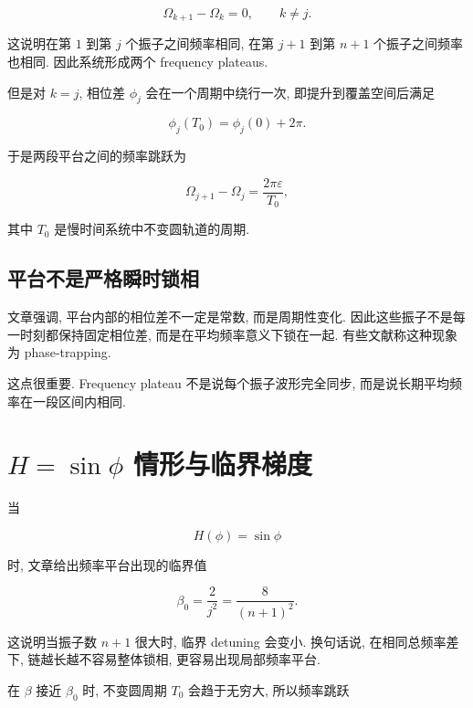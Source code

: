 \documentclass[oneside]{ctexart}
\newcommand{\eps}{\varepsilon}
\begin{document}
\begin{equation}
    \Omega_{k+1}-\Omega_k=0,
    \qquad k\neq j.
\end{equation}

这说明在第 $1$ 到第 $j$ 个振子之间频率相同, 在第 $j+1$ 到第 $n+1$ 个振子之间频率也相同. 因此系统形成两个 frequency plateaus.

但是对 $k=j$, 相位差 $\phi_j$ 会在一个周期中绕行一次, 即提升到覆盖空间后满足

\begin{equation}
    \phi_j(T_0)=\phi_j(0)+2\pi.
\end{equation}

于是两段平台之间的频率跳跃为

\begin{equation}
    \Omega_{j+1}-\Omega_j=\dfrac{2\pi\eps}{T_0},
\end{equation}

其中 $T_0$ 是慢时间系统中不变圆轨道的周期.

\subsection{平台不是严格瞬时锁相}

文章强调, 平台内部的相位差不一定是常数, 而是周期性变化. 因此这些振子不是每一时刻都保持固定相位差, 而是在平均频率意义下锁在一起. 有些文献称这种现象为 phase-trapping.

这点很重要. Frequency plateau 不是说每个振子波形完全同步, 而是说长期平均频率在一段区间内相同.

\section{\texorpdfstring{$H=\sin\phi$}{H=sin(phi)} 情形与临界梯度}

当

\begin{equation}
    H(\phi)=\sin\phi
\end{equation}

时, 文章给出频率平台出现的临界值

\begin{equation}
    \beta_0=\dfrac{2}{j^2}=\dfrac{8}{(n+1)^2}.
\end{equation}

这说明当振子数 $n+1$ 很大时, 临界 detuning 会变小. 换句话说, 在相同总频率差下, 链越长越不容易整体锁相, 更容易出现局部频率平台.

在 $\beta$ 接近 $\beta_0$ 时, 不变圆周期 $T_0$ 会趋于无穷大, 所以频率跳跃
\end{document}
